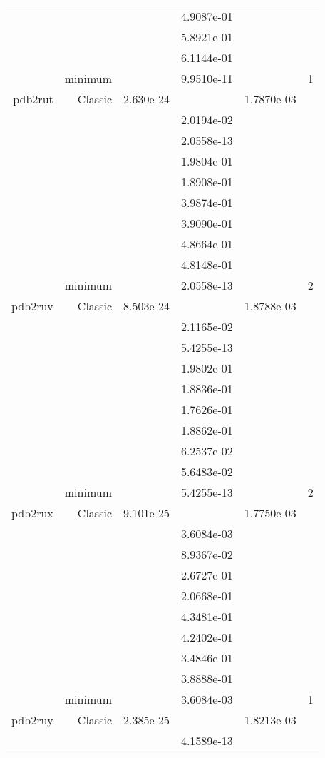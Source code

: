 \begin{xltabular}{\textwidth}{r|rS[table-format=1.3e+2]S[table-format=1.4e+2]S[table-format=1.4e+2]S[table-format=-1.5]}
&  &  & 4.9087e-01 & & \\
&  &  & 5.8921e-01 & & \\
&  &  & 6.1144e-01 & & \\
& minimum &  & 9.9510e-11 & & 1 \\  \addlinespace
pdb2rut & Classic & 2.630e-24 &  & 1.7870e-03 & \\
&  &  & 2.0194e-02 & & \\
&  &  & 2.0558e-13 & & \\
&  &  & 1.9804e-01 & & \\
&  &  & 1.8908e-01 & & \\
&  &  & 3.9874e-01 & & \\
&  &  & 3.9090e-01 & & \\
&  &  & 4.8664e-01 & & \\
&  &  & 4.8148e-01 & & \\
& minimum &  & 2.0558e-13 & & 2 \\  \addlinespace
pdb2ruv & Classic & 8.503e-24 &  & 1.8788e-03 & \\
&  &  & 2.1165e-02 & & \\
&  &  & 5.4255e-13 & & \\
&  &  & 1.9802e-01 & & \\
&  &  & 1.8836e-01 & & \\
&  &  & 1.7626e-01 & & \\
&  &  & 1.8862e-01 & & \\
&  &  & 6.2537e-02 & & \\
&  &  & 5.6483e-02 & & \\
& minimum &  & 5.4255e-13 & & 2 \\  \addlinespace
pdb2rux & Classic & 9.101e-25 &  & 1.7750e-03 & \\
&  &  & 3.6084e-03 & & \\
&  &  & 8.9367e-02 & & \\
&  &  & 2.6727e-01 & & \\
&  &  & 2.0668e-01 & & \\
&  &  & 4.3481e-01 & & \\
&  &  & 4.2402e-01 & & \\
&  &  & 3.4846e-01 & & \\
&  &  & 3.8888e-01 & & \\
& minimum &  & 3.6084e-03 & & 1 \\  \addlinespace
pdb2ruy & Classic & 2.385e-25 &  & 1.8213e-03 & \\
&  &  & 4.1589e-13 & & \\

\end{xltabular}

